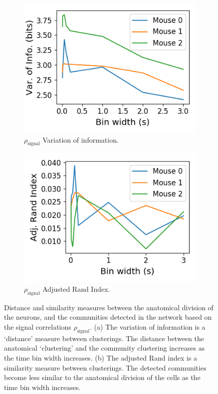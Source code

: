   \begin{figure}[h]
    \begin{subfigure}[h]{0.5\linewidth}
      \includegraphics[width=\linewidth]{figures/eight_probe/variation_of_information_rectified_signal.png}
      \caption{$\rho_{\text{signal}}$ Variation of information.}
      \label{fig:variation_of_information_rectified_signal}
    \end{subfigure}
    \begin{subfigure}[h]{0.5\linewidth}
      \includegraphics[width=\linewidth]{figures/eight_probe/adjusted_rand_index_rectified_signal.png}
      \caption{$\rho_{\text{signal}}$ Adjusted Rand Index.}
      \label{fig:adjusted_rand_index_rectified_signal}
    \end{subfigure}
    \caption{Distance and similarity measures between the anatomical division of the neurons, and the communities detected in the network based on the signal correlations $\rho_{\text{signal}}$. (a) The variation of information is a `distance' measure between clusterings. The distance between the anatomical `clustering' and the community clustering increases as the time bin width increases. (b) The adjusted Rand index is a similarity measure between clusterings. The detected communities become less similar to the anatomical division of the cells as the time bin width increases.}
    \label{fig:signal_clustering_distance_measures}
  \end{figure}

